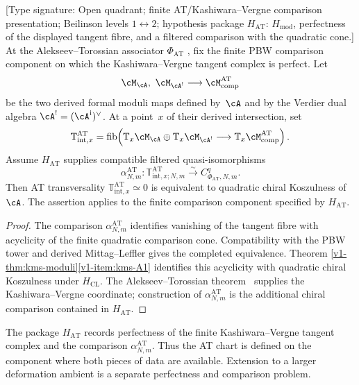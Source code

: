 \begin{proposition}
\label{v1-prop:kms-at-chart}
\ClaimStatusConditional
\textup{[Type signature: Open quadrant; finite AT/Kashiwara--Vergne
comparison presentation; Beilinson levels $1\leftrightarrow2$;
hypothesis package $H_{\mathrm{AT}}$: $H_{\mathrm{mod}}$, perfectness
of the displayed tangent fibre, and a filtered comparison with the
quadratic cone.]}
At the Alekseev--Torossian associator $\Phi_{\mathrm{AT}}$
\cite{AT12}, fix the finite PBW comparison component on which
the Kashiwara--Vergne tangent complex is perfect. Let
\[
\cM_\cA,\ \cM_{\cA^!}\longrightarrow
\cM^{\mathrm{AT}}_{\mathrm{comp}}
\]
be the two derived formal moduli maps defined by~$\cA$ and by
the Verdier dual algebra
$\cA^!=(\cA^{\mathrm i})^\vee$. At a point~$x$ of their
derived intersection, set
\[
\mathbb T^{\mathrm{AT}}_{\mathrm{int},x}
=
\operatorname{fib}\!\left(
\mathbb T_x\cM_\cA\oplus \mathbb T_x\cM_{\cA^!}
\longrightarrow
\mathbb T_x\cM^{\mathrm{AT}}_{\mathrm{comp}}
\right).
\]
Assume $H_{\mathrm{AT}}$ supplies compatible filtered
quasi-isomorphisms
\[
 \alpha^{\mathrm{AT}}_{N,m}\colon
 \mathbb T^{\mathrm{AT}}_{\mathrm{int},x;N,m}
 \xrightarrow{\sim}C^q_{\Phi_{\mathrm{AT}},N,m}.
\]
Then AT transversality
$\mathbb T^{\mathrm{AT}}_{\mathrm{int},x}\simeq0$ is equivalent to
quadratic chiral Koszulness of~$\cA$.  The assertion applies to the
finite comparison component specified by $H_{\mathrm{AT}}$.
\end{proposition}

\begin{proof}
The comparison $\alpha^{\mathrm{AT}}_{N,m}$ identifies vanishing of
the tangent fibre with acyclicity of the finite quadratic comparison
cone.  Compatibility with the PBW tower and derived
Mittag--Leffler gives the completed equivalence.  Theorem
\ref{v1-thm:kms-moduli}\ref{v1-item:kms-A1} identifies this
acyclicity with quadratic chiral Koszulness under $H_{\mathrm{CL}}$.
The Alekseev--Torossian theorem~\cite{AT12} supplies the
Kashiwara--Vergne coordinate; construction of
$\alpha^{\mathrm{AT}}_{N,m}$ is the additional chiral comparison
contained in $H_{\mathrm{AT}}$.
\end{proof}

\begin{remark}
\label{v1-rem:kms-perfectness-internal}
The package $H_{\mathrm{AT}}$ records perfectness of the finite
Kashiwara--Vergne tangent complex and the comparison
$\alpha^{\mathrm{AT}}_{N,m}$.  Thus the AT chart is defined on the
component where both pieces of data are available.  Extension to a
larger deformation ambient is a separate perfectness and comparison
problem.
\end{remark}

